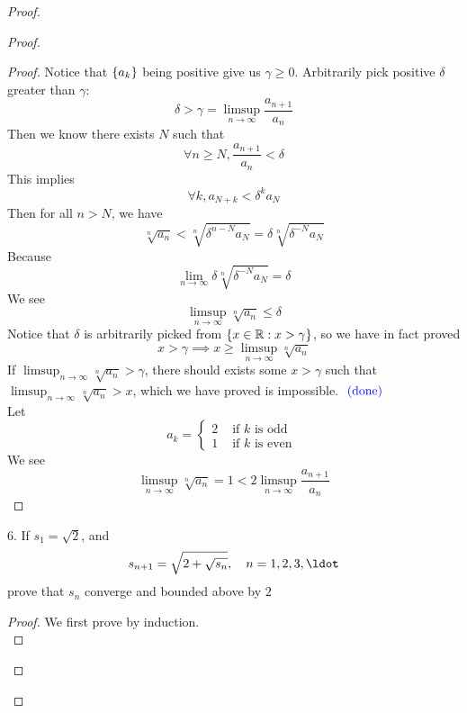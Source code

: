 \documentclass{report}
\begin{document}
\begin{proof}
\begin{proof}
\begin{proof}
Notice that $\{ a_k \}$ being positive give us $\gamma \geq 0$. Arbitrarily pick positive $\delta$ greater than $\gamma $:
\begin{equation}
\delta>\gamma =\limsup_{n\to\infty} \frac{a_{n+1}}{a_n}
\end{equation}
Then we know there exists $N$ such that
 \begin{equation}
\forall n\geq N, \frac{a_{n+1}}{a_n}<\delta 
\end{equation}
This implies
\begin{equation}
\forall k,a_{N+k}<\delta^k a_N
\end{equation}
Then for all $n>N$, we have
 \begin{equation}
\sqrt[n]{a_n}<\sqrt[n]{\delta^{n-N}a_N}=\delta \sqrt[n]{\delta^{-N}a_N} 
\end{equation}
Because
\begin{equation}
\lim_{n\to\infty}\delta \sqrt[n]{\delta ^{-N}a_N} =\delta 
\end{equation}
We see
\begin{equation}
\limsup_{n\to\infty} \sqrt[n]{a_n}\leq \delta 
\end{equation}
Notice that $\delta $ is arbitrarily picked from $\{ x\in\mathbb{R}:x>\gamma  \}$, so we have in fact proved
\begin{equation}
x>\gamma \implies x\geq \limsup_{n\to\infty} \sqrt[n]{a_n} 
\end{equation}
If $\limsup_{n\to\infty} \sqrt[n]{a_n} >\gamma $, there should exists some $x>\gamma $ such that $\limsup_{n\to\infty} \sqrt[n]{a_n}>x$, which we have proved is impossible. $\textcolor{blue}{\text{ (done) }}$\\

Let
\begin{equation}
a_k=\begin{cases}
  2& \text{ if  }k\text{ is odd }\\
  1& \text{ if $k$ is even }
\end{cases}
\end{equation}
We see 
\begin{equation}
\limsup_{n\to\infty} \sqrt[n]{a_n}=1 <2\limsup_{n\to\infty} \frac{a_{n+1}}{a_n}
\end{equation}
\end{proof}
\begin{question}{}{}
6. If $s_1 = \sqrt{2}$, and
\begin{equation}
s_{n+1} =  \sqrt{2+\sqrt{s_n}}, \quad n = 1, 2, 3, \ldot
\end{equation}
prove that $s_n$ converge and bounded above by $2$
\end{question}
\begin{proof}
We first prove  by induction.\\


\end{proof}
\end{proof}
\end{proof}
\end{document}
